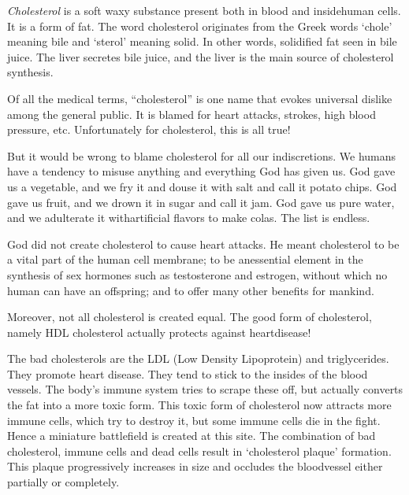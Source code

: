\textit{Cholesterol} is a soft waxy substance present both in blood and inside\break human cells. It is a form of fat. The word cholesterol originates from the Greek words ‘chole’ meaning bile and ‘sterol’ meaning solid. In other words, solidified fat seen in bile juice. The liver secretes bile juice, and the liver is the main source of cholesterol synthesis.

Of all the medical terms, “cholesterol” is one name that evokes universal dislike among the general public. It is blamed for heart attacks, strokes, high blood pressure, etc. Unfortunately for cholesterol, this is all true!

But it would be wrong to blame cholesterol for all our indiscretions. We humans have a tendency to misuse anything and everything God has given us. God gave us a vegetable, and we fry it and douse it with salt and call it potato chips. God gave us fruit, and we drown it in sugar and call it jam. God gave us pure water, and we adulterate it with\break artificial flavors to make colas. The list is endless.

God did not create cholesterol to cause heart attacks. He meant cholesterol to be a vital part of the human cell membrane; to be an\break essential element in the synthesis of sex hormones such as testosterone and estrogen, without which no human can have an offspring; and to offer many other benefits for mankind.

Moreover, not all cholesterol is created equal. The good form of cholesterol, namely HDL cholesterol actually protects against heart\break disease!

The bad cholesterols are the LDL (Low Density Lipoprotein) and triglycerides. They promote heart disease. They tend to stick to the insides of the blood vessels. The body’s immune system tries to scrape these off, but actually converts the fat into a more toxic form. This toxic form of cholesterol now attracts more immune cells, which try to destroy it, but some immune cells die in the fight. Hence a mini\-ature battlefield is created at this site. The combination of bad chole\-sterol, immune cells and dead cells result in ‘cholesterol plaque’ formation. This plaque progressively increases in size and occludes the blood\break vessel either partially or completely.

